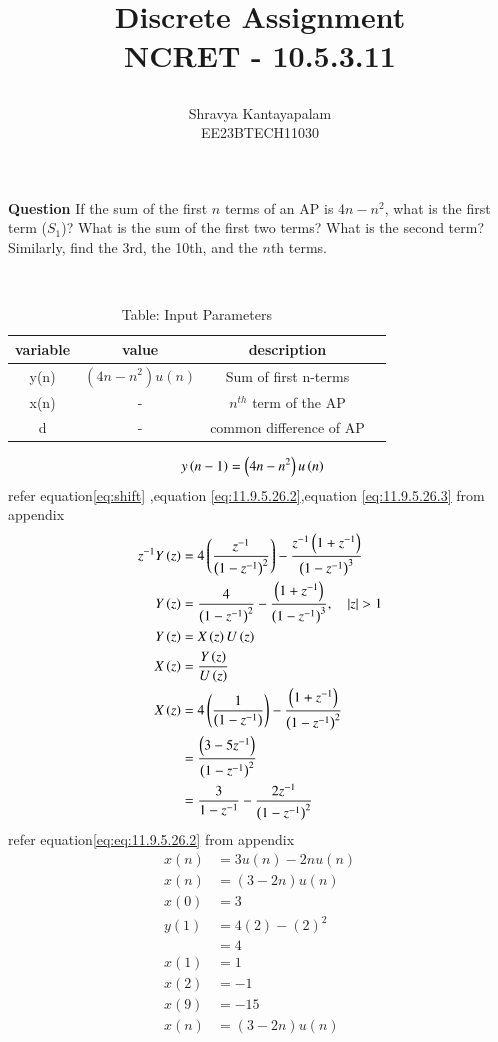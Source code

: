 \documentclass[a4,12pt,onecolumn]{IEEEtran}
\begin{document}
\title{
\Huge\textbf{ Discrete Assignment} \\
\textbf{NCRET - 10.5.3.11}
\author{Shravya Kantayapalam \\EE23BTECH11030}}
\maketitle
\textbf{Question} 
 If the sum of the first $ n $ terms of an AP is $4n - n^2$, what is the first term ($ S_1 $)? What is the sum of the first two terms? What is the second term? Similarly, find the 3rd, the 10th, and the $n$th terms.
 
\solution\\
\begin{table}[ht!]
\begin{center}
\begin{tabular}{|c|c|c|c|}
   \hline
   variable&value&description\\
   \hline 
   y(n)&$(4n-n^2)u(n)$& Sum of first n-terms\\
   \hline
   x(n)&-&$n^{th}$ term of the AP\\
   \hline 
   d&-&common difference of AP\\
   \hline
\end{tabular}
\caption{Table: Input Parameters}
\end{center}
\end{table}
\begin{align}
y\left(n-1\right)&=\left(4n-n^2\right)u\left(n\right)
\end{align}
refer equation\eqref{eq:shift} ,equation \eqref{eq:11.9.5.26.2},equation \eqref{eq:11.9.5.26.3} from appendix
\begin{align}
z^{-1}Y\brak{z} &=4\brak{\frac{z^{-1}}{\brak{1-z^{-1}}^2}}-\frac{z^{-1}\brak{1+z^{-1}}}{\brak{1-z^{-1}}^3}\\
Y\brak{z} &=\frac{4}{\brak{1-z^{-1}}^2}-\frac{\brak{1+z^{-1}}}{\brak{1-z^{-1}}^3},\quad{|z|>1}\\
Y\brak{z}&=X\brak{z}U\brak{z}\\
X\brak{z}&=\frac{Y\brak{z}}{U\brak{z}}\\
X\brak{z}&=4\brak{\frac{1}{\brak{1-z^{-1}}}}-\frac{\brak{1+z^{-1}}}{\brak{1-z^{-1}}^2}\\
&=\frac{\brak{3-5z^{-1}}}{\brak{1-z^{-1}}^2}\\
&=\frac{3}{1-z^{-1}}-\frac{2z^{-1}}{\brak{1-z^{-1}}^2}
\end{align}
refer equation\eqref{eq:eq:11.9.5.26.2} from appendix
\begin{align}
    x(n)&=3u(n)-2nu(n)\\
    x(n)&=(3-2n)u(n)\\
    x(0) &=3\\
   y(1) &= 4(2) - (2)^2\\
    &=4\\
x(1) &= 1 \\
x(2) &= -1 \\
x(9) &= -15 \\
x(n)&=(3-2n)u(n)
\end{align}
\end{document}
